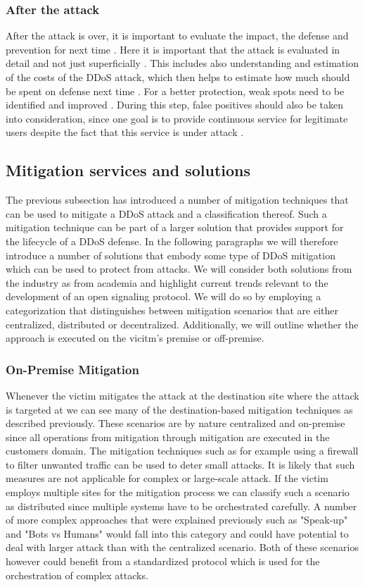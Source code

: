 \subsubsection*{After the attack}

After the attack is over, it is important to evaluate the impact, the defense and prevention for next time \cite{DDoS-Radware}. Here it is important that the attack is evaluated in detail and not just superficially \cite{DDoS-Radware}. This includes also understanding and estimation of the costs of the DDoS attack, which then helps to estimate how much should be spent on defense next time \cite{DDoS-Radware}. For a better protection, weak spots need to be identified and improved \cite{DDoS-Radware}. During this step, false positives should also be taken into consideration, since one goal is to provide continuous service for legitimate users despite the fact that this service is under attack \cite{DDoS-Radware}. 


\subsection{Mitigation services and solutions}
The previous subsection has introduced a number of mitigation techniques that can be used to mitigate a DDoS attack and a classification thereof. Such a mitigation technique can be part of a larger solution that provides support for the lifecycle of a DDoS defense. In the following paragraphs we will therefore introduce a number of solutions that embody some type of DDoS mitigation which can be used to protect from attacks. We will consider both solutions from the industry as from academia and highlight current trends relevant to the development of an open signaling protocol. We will do so by employing a categorization that distinguishes between mitigation scenarios that are either centralized, distributed or decentralized. Additionally, we will outline whether the approach is executed on the vicitm's premise or off-premise.

\subsubsection{On-Premise Mitigation}
Whenever the victim mitigates the attack at the destination site where the attack is targeted at we can see many of the destination-based mitigation techniques as described previously. These scenarios are by nature centralized and on-premise since all operations from mitigation through mitigation are executed in the customers domain. The mitigation techniques such as for example using a firewall to filter unwanted traffic can be used to deter small attacks. It is likely that such measures are not applicable for complex or large-scale attack.
If the victim employs multiple sites for the mitigation process we can classify such a scenario as distributed since multiple systems have to be orchestrated carefully. A number of more complex approaches that were explained previously such as "Speak-up" and "Bots vs Humans" would fall into this category and could have potential to deal with larger attack than with the centralized scenario.
Both of these scenarios however could benefit from a standardized protocol which is used for the orchestration of complex attacks.

